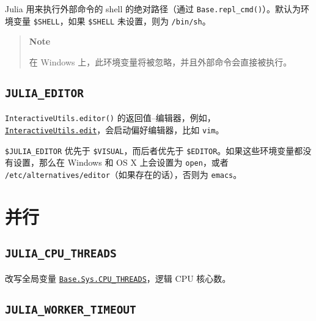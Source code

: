 Julia 用来执行外部命令的 shell 的绝对路径（通过 \texttt{Base.repl\_cmd()}）。默认为环境变量 \texttt{\$SHELL}，如果 \texttt{\$SHELL} 未设置，则为 \texttt{/bin/sh}。



\begin{quote}
\textbf{Note}

在 Windows 上，此环境变量将被忽略，并且外部命令会直接被执行。

\end{quote}


\hypertarget{327473439132778011}{}


\subsection{\texttt{JULIA\_EDITOR}}



\texttt{InteractiveUtils.editor()} 的返回值–编辑器，例如，\hyperlink{10268751953828531961}{\texttt{InteractiveUtils.edit}}，会启动偏好编辑器，比如 \texttt{vim}。



\texttt{\$JULIA\_EDITOR} 优先于 \texttt{\$VISUAL}，而后者优先于 \texttt{\$EDITOR}。如果这些环境变量都没有设置，那么在 Windows 和 OS X 上会设置为 \texttt{open}，或者 \texttt{/etc/alternatives/editor}（如果存在的话），否则为 \texttt{emacs}。



\hypertarget{5963067566394654848}{}


\section{并行}



\hypertarget{9501730119086472793}{}


\subsection{\texttt{JULIA\_CPU\_THREADS}}



改写全局变量 \hyperlink{5072616208401232599}{\texttt{Base.Sys.CPU\_THREADS}}，逻辑 CPU 核心数。



\hypertarget{17625390316676574932}{}


\subsection{\texttt{JULIA\_WORKER\_TIMEOUT}}



